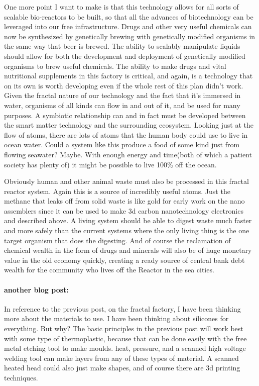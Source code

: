 One more point I want to make is that this technology allows for all
sorts of scalable bio-reactors to be built, so that all the advances of
biotechnology can be leveraged into our free infrastructure. Drugs and
other very useful chemicals can now be synthesized by genetically
brewing with genetically modified organisms in the same way that beer is
brewed. The ability to scalably manipulate liquids should allow for both
the development and deployment of genetically modified organisms to brew
useful chemicals. The ability to make drugs and vital nutritional
supplements in this factory is critical, and again, is a technology that
on its own is worth developing even if the whole rest of this plan
didn't work. Given the fractal nature of our technology and the fact
that it's immersed in water, organisms of all kinds can flow in and out
of it, and be used for many purposes. A symbiotic relationship can and
in fact must be developed between the smart matter technology and the
surrounding ecosystem. Looking just at the flow of atoms, there are lots
of atoms that the human body could use to live in ocean water. Could a
system like this produce a food of some kind just from flowing seawater?
Maybe. With enough energy and time(both of which a patient society has
plenty of) it might be possible to live 100\% off the ocean.

Obviously human and other animal waste must also be processed in this
fractal reactor system. Again this is a source of incredibly useful
atoms. Just the methane that leaks off from solid waste is like gold for
early work on the nano assemblers since it can be used to make 3d carbon
nanotechnology electronics and described above. A living system should
be able to digest waste much faster and more safely than the current
systems where the only living thing is the one target organism that does
the digesting. And of course the reclamation of chemical wealth in the
form of drugs and minerals will also be of huge monetary value in the
old economy quickly, creating a ready source of central bank debt wealth
for the community who lives off the Reactor in the sea cities.

\paragraph{another blog post:}\label{another-blog-post}

In reference to the previous post, on the fractal factory, I have been
thinking more about the materials to use. I have been thinking about
silicones for everything. But why? The basic principles in the previous
post will work best with some type of thermoplastic, because that can be
done easily with the free metal etching tool to make moulds. heat,
pressure, and a scanned high voltage welding tool can make layers from
any of these types of material. A scanned heated head could also just
make shapes, and of course there are 3d printing techniques.

